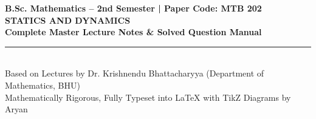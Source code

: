 \documentclass[11pt,a4paper]{article}
\begin{document}
\begin{titlepage}
    \centering
    \vspace*{0.5cm}
    {\large\sffamily\color{secondary}\textbf{B.Sc. Mathematics -- 2nd Semester | Paper Code: MTB 202}}\\[0.8cm]
    {\Huge\bfseries\color{primary} STATICS AND DYNAMICS}\\[0.4cm]
    {\Large\bfseries\color{secondary} Complete Master Lecture Notes \& Solved Question Manual}\\[0.8cm]
    \rule{0.8\textwidth}{1.5pt}\\[1cm]
    {\large\sffamily Based on Lectures by Dr. Krishnendu Bhattacharyya (Department of Mathematics, BHU)}\\[0.4cm]
    {\small\sffamily Mathematically Rigorous, Fully Typeset into LaTeX with TikZ Diagrams by Aryan}\\[1.2cm]
    

\end{titlepage}
\end{document}
